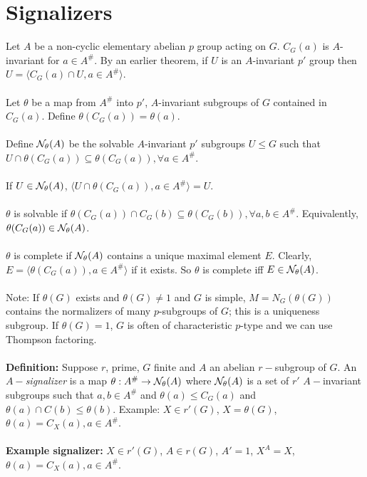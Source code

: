 \section{Signalizers}
Let $A$ be a non-cyclic elementary abelian $p$ group acting on $G$.  $C_G(a)$ is $A$-invariant for
$a \in A^{\#}$.  By an earlier theorem, if $U$ is an $A$-invariant $p'$ group then
$U= \langle C_G(a) \cap U, a \in A^{\#} \rangle$.
\\
\\
Let $\theta$ be a map from $A^{\#}$ into
$p'$, $A$-invariant subgroups of $G$ contained in $C_G(a)$. Define $\theta(C_G(a)) = \theta(a)$.
\\
\\
Define ${\cal N}_{\theta}(A)$ be the solvable $A$-invariant $p'$ subgroups $U \leq G$ such that
$U \cap \theta(C_G(a)) \subseteq \theta(C_G(a)), \forall a \in A^{\#}$.
\\
\\
If $U \in {\cal N}_{\theta}(A)$, $\langle U \cap \theta(C_G(a)), a \in A^{\#} \rangle = U$.
\\
\\
$\theta$ is solvable if $\theta(C_G(a)) \cap C_G(b) \subseteq \theta(C_G(b)), \forall a, b \in A^{\#}$.
Equivalently, $\theta(C_G(a)) \in {\cal N}_{\theta}(A)$.
\\
\\
$\theta$ is complete if ${\cal N}_{\theta}(A)$ contains a unique maximal element $E$.
Clearly, $E = \langle \theta(C_G(a)), a \in A^{\#} \rangle$ if it exists.  So $\theta$
is complete iff $E \in {\cal N}_{\theta}(A)$.
\\
\\
Note: If $\theta(G)$ exists and $\theta(G) \ne 1$ and $G$ is simple, $M=N_G(\theta(G))$
contains the normalizers of many $p$-subgroups of $G$; this is a uniqueness subgroup.
If $\theta(G) = 1$, $G$ is often of characteristic $p$-type and we can use Thompson
factoring.
\\
\\
{\bf Definition:}
Suppose $r$, prime, $G$ finite and $A$ an abelian $r-$subgroup of $G$. An
$A-$\emph{signalizer} is a map $\theta: A^{\#} \rightarrow 
{\cal N}_{\theta}(A)$ 
where ${\cal N}_{\theta}(A)$ is a
set of $r'$ $A-$invariant subgroups such that $a,b \in A^{\#}$ and $\theta(a) \le C_G (a)$
and $\theta(a) \cap C(b) \le \theta(b)$.  Example: $X \in r'(G)$, $X= \theta(G)$,
$\theta(a)= C_X(a), a \in A^{\#}$.
\\
\\
{\bf Example signalizer:} $X \in r'(G)$, $A \in r(G)$, $A'=1$, $X^A=X$, $\theta(a)=C_X(a), a \in A^{\#}$.
